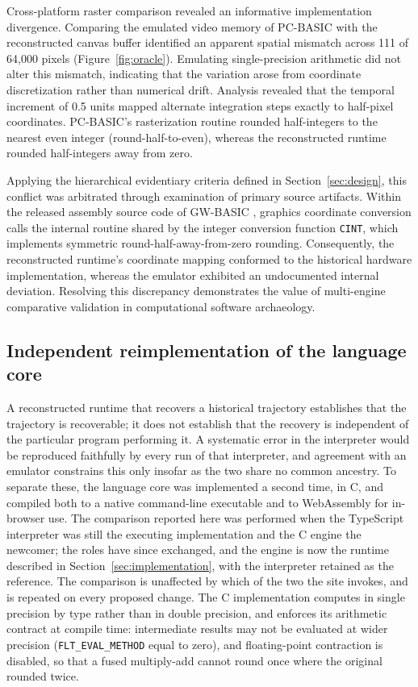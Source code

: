 \documentclass[11pt,a4paper]{article}
\begin{document}
Cross-platform raster comparison revealed an informative implementation divergence. Comparing the emulated video memory of PC-BASIC with the reconstructed canvas buffer identified an apparent spatial mismatch across 111 of 64,000 pixels (Figure~\ref{fig:oracle}). Emulating single-precision arithmetic did not alter this mismatch, indicating that the variation arose from coordinate discretization rather than numerical drift. Analysis revealed that the temporal increment of 0.5 units mapped alternate integration steps exactly to half-pixel coordinates. PC-BASIC's rasterization routine rounded half-integers to the nearest even integer (round-half-to-even), whereas the reconstructed runtime rounded half-integers away from zero. 

Applying the hierarchical evidentiary criteria defined in Section~\ref{sec:design}, this conflict was arbitrated through examination of primary source artifacts. Within the released assembly source code of GW-BASIC \citep{gwbasic}, graphics coordinate conversion calls the internal routine shared by the integer conversion function \texttt{CINT}, which implements symmetric round-half-away-from-zero rounding. Consequently, the reconstructed runtime's coordinate mapping conformed to the historical hardware implementation, whereas the emulator exhibited an undocumented internal deviation. Resolving this discrepancy demonstrates the value of multi-engine comparative validation in computational software archaeology.

\subsection{Independent reimplementation of the language core}

A reconstructed runtime that recovers a historical trajectory establishes that the trajectory is recoverable; it does not establish that the recovery is independent of the particular program performing it. A systematic error in the interpreter would be reproduced faithfully by every run of that interpreter, and agreement with an emulator constrains this only insofar as the two share no common ancestry. To separate these, the language core was implemented a second time, in C, and compiled both to a native command-line executable and to WebAssembly for in-browser use. The comparison reported here was performed when the TypeScript interpreter was still the executing implementation and the C engine the newcomer; the roles have since exchanged, and the engine is now the runtime described in Section~\ref{sec:implementation}, with the interpreter retained as the reference. The comparison is unaffected by which of the two the site invokes, and is repeated on every proposed change. The C implementation computes in single precision by type rather than in double precision, and enforces its arithmetic contract at compile time: intermediate results may not be evaluated at wider precision (\texttt{FLT\_EVAL\_METHOD} equal to zero), and floating-point contraction is disabled, so that a fused multiply-add cannot round once where the original rounded twice.
\end{document}
